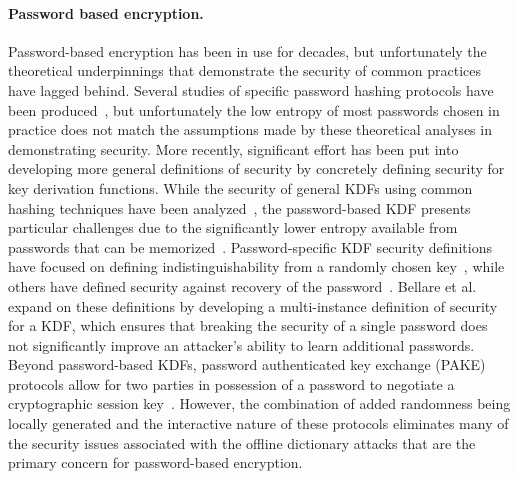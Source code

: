 \paragraph{Password based encryption. }
Password-based encryption has been in use for decades, but unfortunately the theoretical underpinnings that demonstrate the
security of common practices have lagged behind.  Several studies of specific password hashing protocols have been produced~\cite{LR88,WG00,Boyen07},
but unfortunately the low entropy of most passwords chosen in practice does not match the assumptions made by these
theoretical analyses in demonstrating security.  More recently, significant effort has been put into developing more general definitions
of security by concretely defining security for key derivation functions.  While the security of general KDFs using common hashing techniques have been
analyzed~\cite{DGHKR04}, the password-based KDF presents particular challenges due to the significantly lower entropy available from
passwords that can be memorized~\cite{Kraw10}.  Password-specific KDF security definitions have focused on defining indistinguishability from
a randomly chosen key~\cite{YY05}, while others have defined security against recovery of the password~\cite{KSHW98,AW05}.  Bellare et al.~\cite{BRT12}
expand on these definitions by developing a multi-instance definition of security for a KDF, which ensures that breaking the
security of a single password does not significantly improve an attacker's ability to learn additional passwords.
Beyond password-based KDFs, password authenticated key exchange (PAKE) protocols allow for two parties in possession of a password
to negotiate a cryptographic session key~\cite{BPR00,GL03,CHKLM05}.  However, the combination of added randomness being locally generated and the interactive
nature of these protocols eliminates many of the security issues associated with the offline dictionary attacks that are the primary concern for
password-based encryption.

